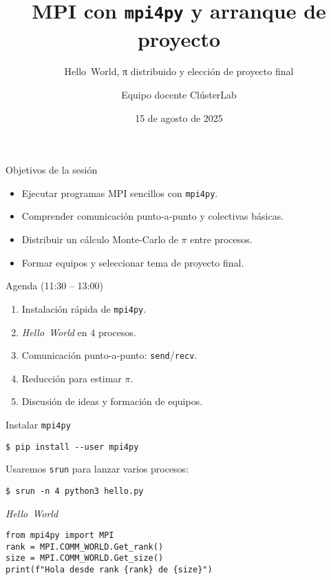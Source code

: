 \documentclass[aspectratio=169,professionalfonts]{beamer}
\title[ClústerLab • Día 6]{MPI con \texttt{mpi4py} y arranque de proyecto}
\subtitle{Hello World, π distribuido y elección de proyecto final}
\author{Equipo docente ClústerLab}
\date{15 de agosto de 2025}
\begin{document}
\begin{frame}[plain]
  \titlepage
\end{frame}

\begin{frame}[fragile]{Objetivos de la sesión}
  \begin{itemize}
    \item Ejecutar programas MPI sencillos con \texttt{mpi4py}.
    \item Comprender comunicación punto‑a‑punto y colectivas básicas.
    \item Distribuir un cálculo Monte‑Carlo de \(\pi\) entre procesos.
    \item Formar equipos y seleccionar tema de proyecto final.
  \end{itemize}
\end{frame}

\begin{frame}[fragile]{Agenda (11:30 – 13:00)}
  \begin{enumerate}
    \item Instalación rápida de \texttt{mpi4py}.
    \item \textit{Hello World} en 4 procesos.
    \item Comunicación punto-a-punto: \texttt{send}/\texttt{recv}.
    \item Reducción para estimar \(\pi\).
    \item Discusión de ideas y formación de equipos.
  \end{enumerate}
\end{frame}

\begin{frame}[fragile]{Instalar \texttt{mpi4py}}
  \begin{verbatim}
$ pip install --user mpi4py
  \end{verbatim}
  Usaremos \texttt{srun} para lanzar varios procesos:
  \begin{verbatim}
$ srun -n 4 python3 hello.py
  \end{verbatim}
\end{frame}

\begin{frame}[fragile]{\textit{Hello World}}
  \begin{verbatim}
from mpi4py import MPI
rank = MPI.COMM_WORLD.Get_rank()
size = MPI.COMM_WORLD.Get_size()
print(f"Hola desde rank {rank} de {size}")
  \end{verbatim}
\end{frame}
\end{document}
